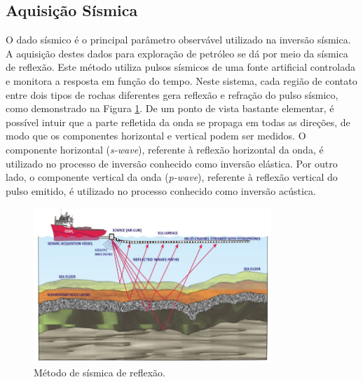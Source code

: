 \subsection{Aquisição Sísmica}
O dado sísmico é o principal parâmetro observável utilizado na inversão sísmica.
A aquisição destes dados para exploração de petróleo se dá por meio da sísmica de reflexão. Este
método utiliza pulsos sísmicos de uma fonte artificial controlada e monitora a resposta em
função do tempo. Neste sistema, cada região de contato entre dois tipos de rochas
diferentes gera reflexão e refração do pulso sísmico, como demonstrado na Figura
\ref{fig:1sismica}.
De um ponto de vista bastante elementar, é possível intuir que a parte refletida da onda se
propaga em todas as direções, de modo que os componentes horizontal e vertical podem ser medidos.
O componente horizontal (\textit{s-wave}), referente à reflexão horizontal
da onda, é utilizado no processo de inversão conhecido como inversão elástica. Por outro lado, o componente
vertical da onda (\textit{p-wave}), referente à reflexão vertical do pulso emitido, é utilizado no processo
conhecido como inversão acústica.
\begin{figure}[ht!]
\begin{center}
  \includegraphics[width=0.8\textwidth]{fig/seismic_survey_2}
  \caption{Método de sísmica de reflexão. \citep{figsismica}}
  \label{fig:1sismica}
\end{center}
\end{figure}

